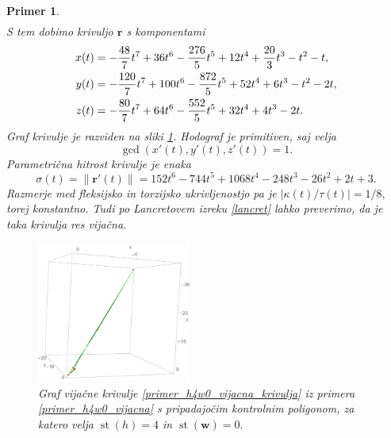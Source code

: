 \documentclass[12pt,a4paper,twoside]{article}
\theoremstyle{definition} %
\theoremstyle{plain} %
\theoremstyle{primerstyle}
\newtheorem{primer}[definicija]{Primer}
\numberwithin{equation}{section}  %
\newcommand{\rV}{\mathbf{r}}
\newcommand{\wV}{\mathbf{w}}
\DeclareMathOperator{\st}{st}
\begin{document}
\begin{primer}
\begin{align*}
	\end{align*}
	S tem dobimo krivuljo $\rV$ s komponentami
	\begin{align}
		x(t)&=-\frac{48}{7}t^7+36t^6-\frac{276}{5}t^5+12t^4+\frac{20}{3}t^3-t^2-t,\notag\\
		y(t)&=-\frac{120}{7}t^7+100t^6-\frac{872}{5}t^5+52t^4+6t^3-t^2-2t,\label{primer_h4w0_vijacna_krivulja}\\
		z(t)&=-\frac{80}{7}t^7+64t^6-\frac{552}{5}t^5+32t^4+4t^3-2t.\notag
	\end{align}
	Graf krivulje je razviden na sliki \ref{fig:h4w0_vijacna}. Hodograf je primitiven, saj velja $$\gcd(x'(t),y'(t),z'(t))=1.$$ Parametrična hitrost krivulje je enaka
	\begin{equation*}
		\sigma(t)=\lVert\rV'(t)\rVert=152t^6-744t^5+1068t^4-248t^3-26t^2+2t+3.
	\end{equation*}
	Razmerje med fleksijsko in torzijsko ukrivljenostjo pa je $|\kappa(t)/\tau(t)|=1/8,$ torej konstantno. Tudi po Lancretovem izreku \ref{lancret} lahko preverimo, da je taka krivulja res vijačna.
	\begin{figure}[h]
	  \centering
	  \includegraphics[width=0.45\textwidth]{images/h4w0_vijacna.pdf}
	  \caption[Primer vijačne krivulje ($\st(h)=4,$ $\st(\wV)=0$)]{Graf vijačne krivulje \eqref{primer_h4w0_vijacna_krivulja} iz primera \ref{primer_h4w0_vijacna} s pripadajočim kontrolnim poligonom, za katero velja $\st(h)=4$ in $\st(\wV)=0.$}
	  \label{fig:h4w0_vijacna}
	\end{figure}
\end{primer}
\end{document}
